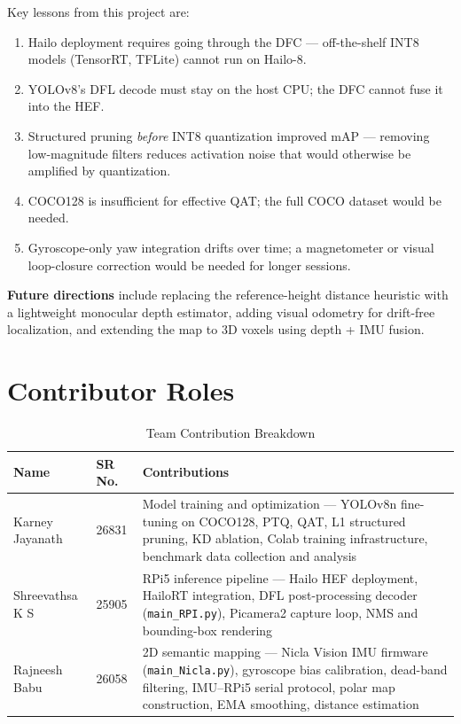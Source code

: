 \documentclass[journal, onecolumn]{IEEEtran}
\begin{document}
Key lessons from this project are:
\begin{enumerate}
  \item Hailo deployment requires going through the DFC — off-the-shelf INT8 models (TensorRT, TFLite) cannot run on Hailo-8.
  \item YOLOv8's DFL decode must stay on the host CPU; the DFC cannot fuse it into the HEF.
  \item Structured pruning \emph{before} INT8 quantization improved mAP — removing low-magnitude filters reduces activation noise that would otherwise be amplified by quantization.
  \item COCO128 is insufficient for effective QAT; the full COCO dataset would be needed.
  \item Gyroscope-only yaw integration drifts over time; a magnetometer or visual loop-closure correction would be needed for longer sessions.
\end{enumerate}

\noindent\textbf{Future directions} include replacing the reference-height distance heuristic with a lightweight monocular depth estimator, adding visual odometry for drift-free localization, and extending the map to 3D voxels using depth + IMU fusion.

\section*{Contributor Roles}

\begin{table}[H]
\centering
\caption{Team Contribution Breakdown}
\label{tab:contrib}
\begin{tabular}{llp{9.5cm}}
\toprule
\textbf{Name} & \textbf{SR No.} & \textbf{Contributions} \\
\midrule
Karney Jayanath & 26831 &
  Model training and optimization — YOLOv8n fine-tuning on COCO128, PTQ, QAT, L1 structured pruning, KD ablation, Colab training infrastructure, benchmark data collection and analysis \\
Shreevathsa K S & 25905 &
  RPi5 inference pipeline — Hailo HEF deployment, HailoRT integration, DFL post-processing decoder (\texttt{main\_RPI.py}), Picamera2 capture loop, NMS and bounding-box rendering \\
Rajneesh Babu & 26058 &
  2D semantic mapping — Nicla Vision IMU firmware (\texttt{main\_Nicla.py}), gyroscope bias calibration, dead-band filtering, IMU–RPi5 serial protocol, polar map construction, EMA smoothing, distance estimation \\
\bottomrule
\end{tabular}
\end{table}
\end{document}
